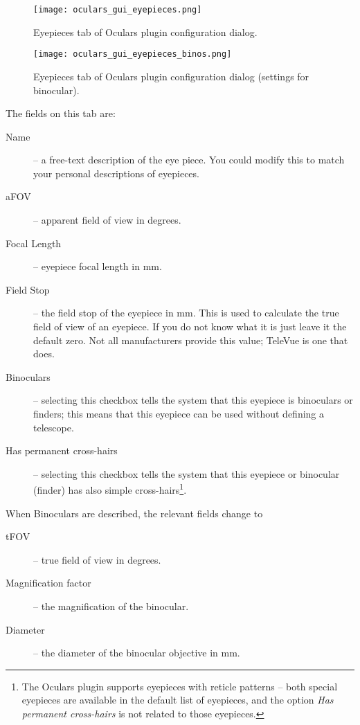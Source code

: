 \begin{figure}[p]\centering
\texttt{[image: oculars\_gui\_eyepieces.png]}
\caption{Eyepieces tab of Oculars plugin configuration dialog.}
\label{fig:plugins:Oculars:Gui:Eyepieces}
\end{figure}

\begin{figure}[p]\centering
\texttt{[image: oculars\_gui\_eyepieces\_binos.png]}
\caption{Eyepieces tab of Oculars plugin configuration dialog (settings for binocular).}
\label{fig:plugins:Oculars:Gui:Eyepieces_binos}
\end{figure}


The fields on this tab are:
\begin{description}
\item[Name] -- a free-text description of the eye piece. You could modify this to match your personal descriptions of eyepieces.
\item[aFOV] -- apparent field of view in degrees.
\item[Focal Length] -- eyepiece focal length in mm.
\item[Field Stop] -- the field stop of the eyepiece in mm. This is used to calculate the true field of view of an eyepiece. If you do not know what it is just leave it the default zero. Not all manufacturers provide this value; TeleVue is one that does.
\item[Binoculars] -- selecting this checkbox tells the system that this eyepiece is binoculars or finders; this means that this eyepiece can be used without defining a telescope.
\item[Has permanent cross-hairs] -- selecting this checkbox tells the system that this eyepiece or binocular (finder) has also simple cross-hairs\footnote{The Oculars plugin supports eyepieces with reticle patterns -- both special eyepieces are available in the default list of eyepieces, and the option \emph{Has permanent cross-hairs} is not related to those eyepieces.}.
\end{description}
When Binoculars are described, the relevant fields change to
\begin{description}
\item[tFOV] -- true field of view in degrees.
\item[Magnification factor] -- the magnification of the binocular.
\item[Diameter] -- the diameter of the binocular objective in mm.
\end{description}


